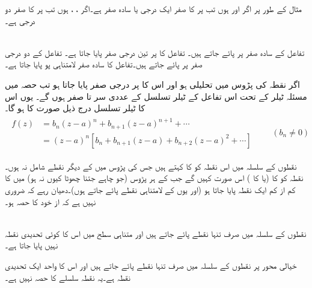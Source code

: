 مثال کے طور پر اگر  اور  ہوں تب  پر  کا صفر ایک درجی  یا سادہ صفر ہے۔اگر ، ،  ہوں تب  پر  کا صفر دو درجی ہے۔ 

\quad {}\\
تفاعل  کے سادہ صفر  پر پائے جاتے ہیں۔ تفاعل  کا  پر تین درجی صفر پایا جاتا ہے۔ تفاعل  کے دو درجی صفر  پر پائے جاتے ہیں۔تفاعل  کا سادہ صفر لامتناہی پو پایا جاتا ہے۔

اگر  نقطہ  کی پڑوس میں تحلیلی ہو اور اس کا  پر  درجی صفر پایا جاتا ہو تب حصہ  میں مسئلہ ٹیلر کے تحت اس تفاعل کے ٹیلر تسلسل کے عددی سر  تا  صفر ہوں گے۔ یوں اس کا ٹیلر تسلسل درج ذیل صورت کا ہو گا۔
\begin{gather}
\begin{aligned}\label{مساوات_ٹیلر_ابتدائی_عددی_سر_صفر_ہیں}
f(z)&=b_n(z-a)^n+b_{n+1}(z-a)^{n+1}+\cdots\\
&=(z-a)^n[b_n+b_{n+1}(z-a)+b_{n+2}(z-a)^2+\cdots]
\end{aligned}
\quad \quad (b_n\ne 0)
\end{gather}

نقطوں کے سلسلہ  میں اس نقطہ کو  کا  کہتے ہیں جس کی پڑوس میں  کے دیگر نقطے شامل نہ ہوں۔نقطہ  کو  کا  (یا  کا ) اس صورت کہیں گے جب  کے ہر پڑوس (جو چاہے جتنا چھوٹا کیوں نہ ہو) میں  کا کم از کم ایک نقطہ   پایا جاتا ہو (اور یوں  کے لامتناہی نقطے پائے جاتے ہوں)۔دھیان رہے کہ ضروری نہیں ہے کہ   از خود  کا حصہ ہو۔ 

\quad {}\\
نقطوں کے سلسلہ  میں صرف تنہا نقطے پائے جاتے ہیں اور متناہی سطح میں اس کا کوئی تحدیدی نقطہ نہیں پایا جاتا ہے۔

خیالی محور پر نقطوں کے سلسلہ  میں صرف تنہا نقطے پائے جاتے ہیں اور اس کا واحد ایک تحدیدی نقطہ  ہے۔یہ نقطہ سلسلے کا حصہ نہیں ہے۔

